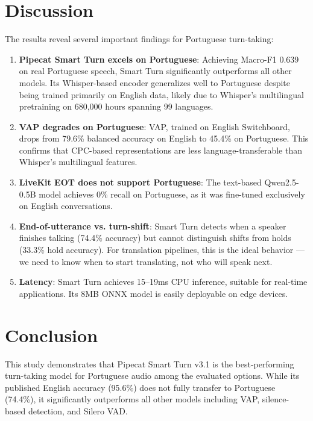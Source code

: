 \documentclass[conference]{IEEEtran}
\begin{document}
\section{Discussion}

The results reveal several important findings for Portuguese turn-taking:

\begin{enumerate}
    \item \textbf{Pipecat Smart Turn excels on Portuguese}: Achieving Macro-F1 0.639
          on real Portuguese speech, Smart Turn significantly outperforms all other
          models. Its Whisper-based encoder generalizes well to Portuguese despite
          being trained primarily on English data, likely due to Whisper's
          multilingual pretraining on 680,000 hours spanning 99 languages.

    \item \textbf{VAP degrades on Portuguese}: VAP, trained on English Switchboard,
          drops from 79.6\% balanced accuracy on English to 45.4\% on Portuguese.
          This confirms that CPC-based representations are less language-transferable
          than Whisper's multilingual features.

    \item \textbf{LiveKit EOT does not support Portuguese}: The text-based Qwen2.5-0.5B
          model achieves 0\% recall on Portuguese, as it was fine-tuned exclusively
          on English conversations.

    \item \textbf{End-of-utterance vs. turn-shift}: Smart Turn detects when a speaker
          finishes talking (74.4\% accuracy) but cannot distinguish shifts from holds
          (33.3\% hold accuracy). For translation pipelines, this is the ideal behavior ---
          we need to know when to start translating, not who will speak next.

    \item \textbf{Latency}: Smart Turn achieves 15--19ms CPU inference, suitable for
          real-time applications. Its 8MB ONNX model is easily deployable on edge devices.
\end{enumerate}

\section{Conclusion}

This study demonstrates that Pipecat Smart Turn v3.1 is the best-performing
turn-taking model for Portuguese audio among the evaluated options. While
its published English accuracy (95.6\%) does not fully transfer to Portuguese
(74.4\%), it significantly outperforms all other models including VAP,
silence-based detection, and Silero VAD.
\end{document}
